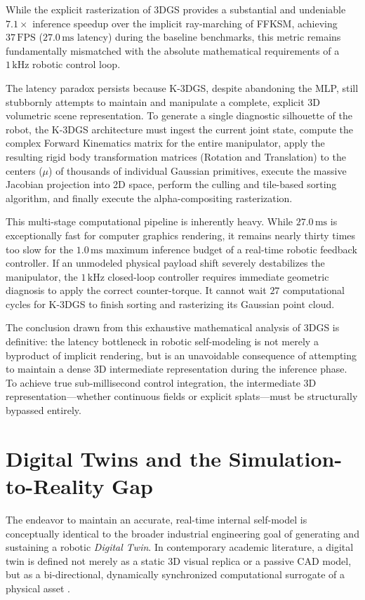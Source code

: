 \documentclass[12pt,a4paper,oneside]{report}
\begin{document}
While the explicit rasterization of 3DGS provides a substantial and undeniable $7.1\times$ inference speedup over the implicit ray-marching of FFKSM, achieving $37\,\mathrm{FPS}$ ($27.0\,\mathrm{ms}$ latency) during the baseline benchmarks, this metric remains fundamentally mismatched with the absolute mathematical requirements of a $1\,\mathrm{kHz}$ robotic control loop.

The latency paradox persists because K-3DGS, despite abandoning the MLP, still stubbornly attempts to maintain and manipulate a complete, explicit 3D volumetric scene representation. To generate a single diagnostic silhouette of the robot, the K-3DGS architecture must ingest the current joint state, compute the complex Forward Kinematics matrix for the entire manipulator, apply the resulting rigid body transformation matrices (Rotation and Translation) to the centers ($\mu$) of thousands of individual Gaussian primitives, execute the massive Jacobian projection into 2D space, perform the culling and tile-based sorting algorithm, and finally execute the alpha-compositing rasterization. 

This multi-stage computational pipeline is inherently heavy. While $27.0\,\mathrm{ms}$ is exceptionally fast for computer graphics rendering, it remains nearly thirty times too slow for the $1.0\,\mathrm{ms}$ maximum inference budget of a real-time robotic feedback controller. If an unmodeled physical payload shift severely destabilizes the manipulator, the $1\,\mathrm{kHz}$ closed-loop controller requires immediate geometric diagnosis to apply the correct counter-torque. It cannot wait $27$ computational cycles for K-3DGS to finish sorting and rasterizing its Gaussian point cloud.

The conclusion drawn from this exhaustive mathematical analysis of 3DGS is definitive: the latency bottleneck in robotic self-modeling is not merely a byproduct of implicit rendering, but is an unavoidable consequence of attempting to maintain a dense 3D intermediate representation during the inference phase. To achieve true sub-millisecond control integration, the intermediate 3D representation—whether continuous fields or explicit splats—must be structurally bypassed entirely.

\section{Digital Twins and the Simulation-to-Reality Gap}

The endeavor to maintain an accurate, real-time internal self-model is conceptually identical to the broader industrial engineering goal of generating and sustaining a robotic \textit{Digital Twin}. In contemporary academic literature, a digital twin is defined not merely as a static 3D visual replica or a passive CAD model, but as a bi-directional, dynamically synchronized computational surrogate of a physical asset \cite{jiang2024digitaltwin, mari2024digitaltwin}. 
\end{document}
